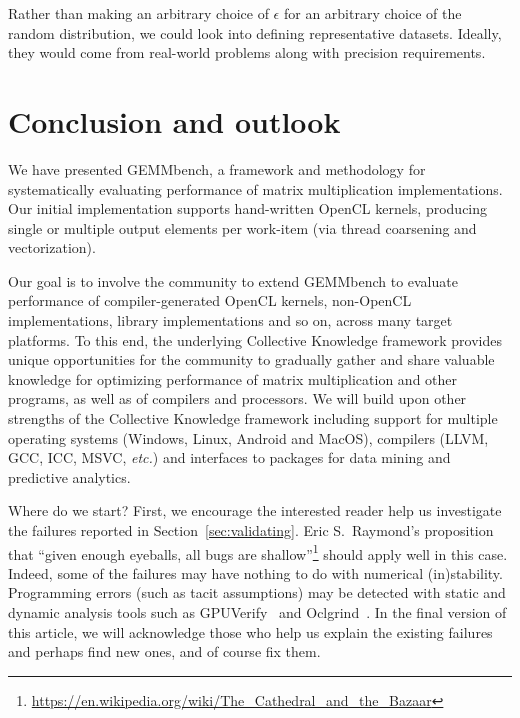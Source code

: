 \documentclass{acm_proc_article-sp} %
\begin{document}
Rather than making an arbitrary choice of $\epsilon$ for an arbitrary choice of
the random distribution, we could look into defining representative datasets.
%
Ideally, they would come from real-world problems along with precision
requirements.
%


\section{Conclusion and outlook}

We have presented GEMMbench, a framework and methodology for systematically
evaluating performance of matrix multiplication implementations.
%
Our initial implementation supports hand-written OpenCL kernels, producing
single or multiple output elements per work-item (via thread coarsening and
vectorization).
%

Our goal is to involve the community to extend GEMMbench to evaluate
performance of compiler-generated OpenCL kernels, non-OpenCL implementations,
library implementations and so on, across many target platforms.
%
To this end, the underlying Collective Knowledge framework provides unique
opportunities for the community to gradually gather and share valuable
knowledge for optimizing performance of matrix multiplication and other
programs, as well as of compilers and processors.
%
We will build upon other strengths of the Collective Knowledge framework including
support for multiple operating systems (Windows, Linux, Android and MacOS),
compilers (LLVM, GCC, ICC, MSVC, {\em etc.}) and interfaces to packages for
data mining and predictive analytics.

Where do we start?
%
First, we encourage the interested reader help us investigate the failures
reported in Section~\ref{sec:validating}.
%
Eric S.\ Raymond's proposition that ``given enough eyeballs, all bugs are
shallow''\footnote{\url{https://en.wikipedia.org/wiki/The_Cathedral_and_the_Bazaar}}
should apply well in this case.
%
Indeed, some of the failures may have nothing to do with numerical
(in)stability. 
%
Programming errors (such as tacit assumptions) may be detected with static and
dynamic analysis tools such as GPUVerify~\cite{GPUVerify} and
Oclgrind~\cite{Oclgrind}.
%
In the final version of this article, we will acknowledge those who help us
explain the existing failures and perhaps find new ones, and of course fix them.
\end{document}
